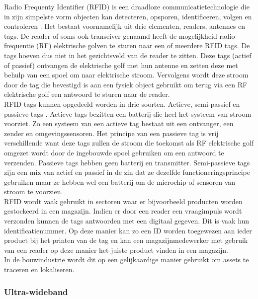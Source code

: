 Radio Frequenty Identifier (RFID)  is een draadloze communicatietechnologie die in zijn simpelste vorm objecten kan detecteren, opsporen, identificeren, volgen en controleren \autocite{Tan2022}. Het bestaat voornamelijk uit drie elementen, readers, antennes en tags. De reader of soms ook transeiver genaamd heeft de mogelijkheid radio frequentie (RF) elektrische golven te sturen naar een of meerdere RFID tags. De tags hoeven dus niet in het gezichtsveld van de reader te zitten. Deze tags (actief of passief) ontvangen de elektrische golf met hun antenne en zetten deze met behulp van een spoel om naar elektrische stroom. Vervolgens wordt deze stroom door de tag die bevestigd is aan een fysiek object gebruikt om terug via een RF elektrische golf een antwoord te sturen naar de reader.\\

RFID tags kunnen opgedeeld worden in drie soorten. Actieve, semi-passief en passieve tags \autocite{Mezzanotte2021}.  Actieve tags bezitten een batterij die heel het systeem van stroom voorziet. Zo een systeem van een actieve tag bestaat uit een ontvanger, een zender en omgevingssensoren. Het principe van een passieve tag is vrij verschillende want deze tags zullen de stroom die toekomst als RF elektrische golf omgezet wordt door de ingebouwde spoel gebruiken om een antwoord te verzenden. Passieve tags hebben geen batterij en transmitter. Semi-passieve tags zijn een mix van actief en passief in de zin dat ze dezelfde functioneringsprincipe gebruiken maar ze hebben wel een batterij om de microchip of sensoren van stroom te voorzien.\\

RFID wordt vaak gebruikt in sectoren waar er bijvoorbeeld producten worden gestockeerd in een magazijn. Indien er door een reader een vraagimpuls wordt verzonden kunnen de tags antwoorden met een digitaal gegeven. Dit is vaak hun identificatienummer. Op deze manier kan zo een ID worden toegewezen aan ieder product bij het printen van de tag en kan een magazijnmedewerker met gebruik van een reader op deze manier het juiste product vinden in een magazijn.\\

In de bouwindustrie wordt dit op een gelijkaardige manier gebruikt om assets te traceren en lokaliseren.

\subsubsection{Ultra-wideband}


